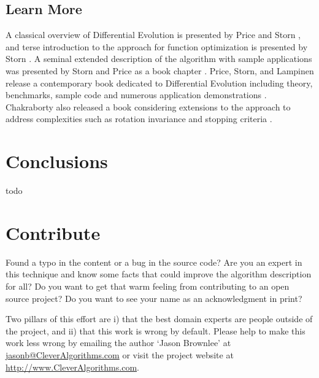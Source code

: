\documentclass[a4paper, 11pt]{article}
\makeatletter
\newcommand{\myreportauthor}{Jason Brownlee}
\newcommand{\myreportemail}{jasonb@CleverAlgorithms.com}
\newcommand{\myreportwebsite}{http://www.CleverAlgorithms.com}
\makeatother
\begin{document}
% 
% 
\subsection{Learn More}
A classical overview of Differential Evolution is presented by Price and Storn \cite{Price1997}, and terse introduction to the approach for function optimization is presented by Storn \cite{Storn1996}. A seminal extended description of the algorithm with sample applications was presented by Storn and Price as a book chapter \cite{Price1999}.
Price, Storn, and Lampinen release a contemporary book dedicated to Differential Evolution including theory, benchmarks, sample code and numerous application demonstrations \cite{Price2005}. Chakraborty also released a book considering extensions to the approach to address complexities such as rotation invariance and stopping criteria  \cite{Chakraborty2008}.

% 
% 
\section{Conclusions}
\label{sec:conclusions}
todo


% 
% 
\section{Contribute}
\label{sec:contribute}
Found a typo in the content or a bug in the source code? 
Are you an expert in this technique and know some facts that could improve the algorithm description for all?
Do you want to get that warm feeling from contributing to an open source project? 
Do you want to see your name as an acknowledgment in print?

Two pillars of this effort are i) that the best domain experts are people outside of the project, and ii) that this work is wrong by default. 
Please help to make this work less wrong by emailing the author `\myreportauthor' at \url{\myreportemail} or visit the project website at \url{\myreportwebsite}.



\end{document}
